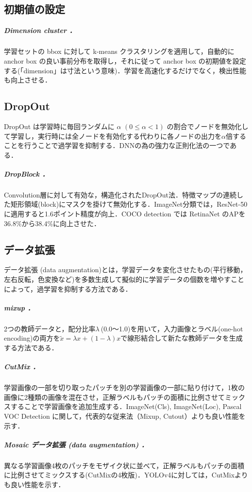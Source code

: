 \documentclass[twocolumn]{jsarticle} %
\begin{document}
\subsection{初期値の設定}
\subparagraph{Dimension cluster \cite{RedFar17}．} 学習セットの bbox に対して k-means クラスタリングを適用して，自動的に anchor box の良い事前分布を取得し，それに従って anchor box の初期値を設定する(「dimension」は寸法という意味)．学習を高速化するだけでなく，検出性能も向上させる．

\subsection{DropOut}
DropOut\cite{SHKSS14} は学習時に毎回ランダムに $\alpha$ $(0\leq\alpha<1)$ の割合でノードを無効化して学習し，実行時には全ノードを有効化する代わりに各ノードの出力を$\alpha$倍することを行うことで過学習を抑制する．DNNの為の強力な正則化法の一つである．

\subparagraph{DropBlock \cite{GLL18}．} \label{sec:DropBlock} Convolution層に対して有効な，構造化されたDropOut法．特徴マップの連続した矩形領域(block)にマスクを掛けて無効化する．ImageNet分類では，ResNet-50 に適用すると1.6ポイント精度が向上．COCO detection では RetinaNet のAPを36.8\%から38.4\%に向上させた．

\subsection{データ拡張}
データ拡張 (data augmentation)\cite{KSH12}とは，学習データを変化させたもの(平行移動，左右反転，色変換など)を多数生成して擬似的に学習データの個数を増やすことによって，過学習を抑制する方法である．

\subparagraph{mixup \cite{ZCDL18}．} 2つの教師データと，配分比率$\lambda\ $(0.0〜1.0)を用いて，入力画像とラベル(one-hot encoding)の両方を$\tilde{x}=\lambda x+(1-\lambda)x$で線形結合して新たな教師データを生成する方法である．

\subparagraph{CutMix \cite{YHCOYC19}．} \label{sec:CutMix} 学習画像の一部を切り取ったパッチを別の学習画像の一部に貼り付けて，1枚の画像に2種類の画像を混在させ，正解ラベルもパッチの面積に比例させてミックスすることで学習画像を追加生成する．ImageNet(Cls), ImageNet(Loc), Pascal VOC Detection に関して，代表的な従来法（Mixup, Cutout）よりも良い性能を示す．

\subparagraph{Mosaic データ拡張 (data augmentation) \cite{BWL20}．} \label{sec:mosaic}
異なる学習画像4枚のパッチをモザイク状に並べて，正解ラベルもパッチの面積に比例させてミックスする(CutMixの4枚版)．YOLOv4に対しては，CutMixよりも良い性能を示す．
\end{document}
